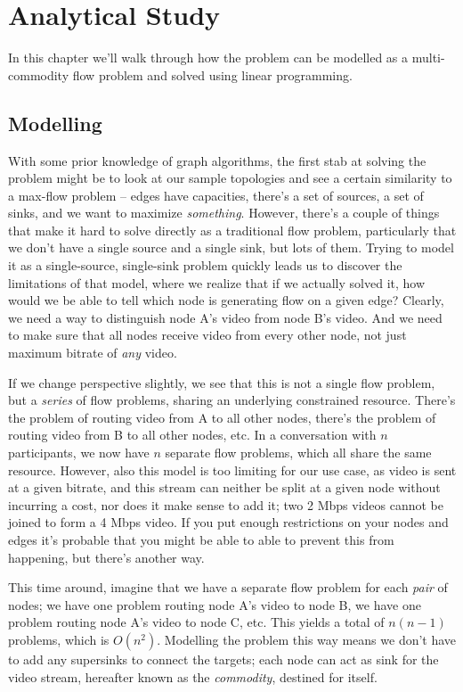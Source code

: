 \chapter{Analytical Study}
\label{chp:suggested-solution}

In this chapter we'll walk through how the problem can be modelled as a multi-commodity flow problem and solved using linear programming.


\section{Modelling}

With some prior knowledge of graph algorithms, the first stab at solving the problem might be to look at our sample topologies and see a certain similarity to a max-flow problem -- edges have capacities, there's a set of sources, a set of sinks, and we want to maximize \emph{something}. However, there's a couple of things that make it hard to solve directly as a traditional flow problem, particularly that we don't have a single source and a single sink, but lots of them. Trying to model it as a single-source, single-sink problem quickly leads us to discover the limitations of that model, where we realize that if we actually solved it, how would we be able to tell which node is generating flow on a given edge? Clearly, we need a way to distinguish node A's video from node B's video. And we need to make sure that all nodes receive video from every other node, not just maximum bitrate of \emph{any} video.

If we change perspective slightly, we see that this is not a single flow problem, but a \emph{series} of flow problems, sharing an underlying constrained resource. There's the problem of routing video from A to all other nodes, there's the problem of routing video from B to all other nodes, etc. In a conversation with $n$ participants, we now have $n$ separate flow problems, which all share the same resource. However, also this model is too limiting for our use case, as video is sent at a given bitrate, and this stream can neither be split at a given node without incurring a cost, nor does it make sense to add it; two 2 Mbps videos cannot be joined to form a 4 Mbps video. If you put enough restrictions on your nodes and edges it's probable that you might be able to able to prevent this from happening, but there's another way.

This time around, imagine that we have a separate flow problem for each \emph{pair} of nodes; we have one problem routing node A's video to node B, we have one problem routing node A's video to node C, etc. This yields a total of $n(n-1)$ problems, which is $O(n^2)$. Modelling the problem this way means we don't have to add any supersinks to connect the targets; each node can act as sink for the video stream, hereafter known as the \emph{commodity}, destined for itself.

